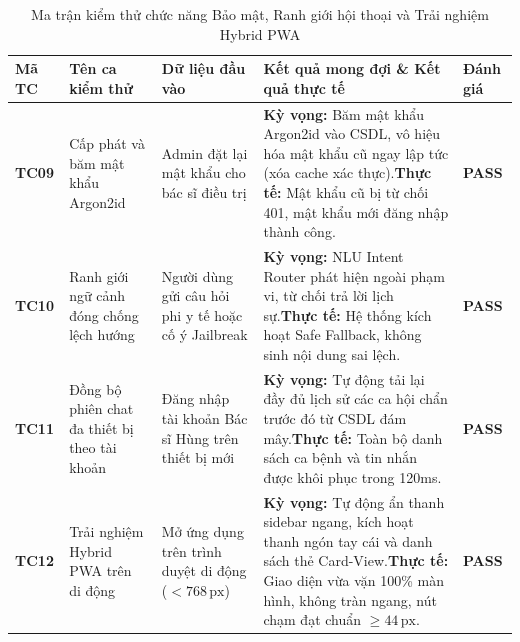 \begin{table}[htbp]
\centering
\small
\begin{tabularx}{\textwidth}{C{1.2cm} L{3.5cm} L{3.5cm} Y C{1.5cm}}
\toprule
\textbf{Mã TC} & \textbf{Tên ca kiểm thử} & \textbf{Dữ liệu đầu vào} & \textbf{Kết quả mong đợi \& Kết quả thực tế} & \textbf{Đánh giá} \\
\midrule
\textbf{TC09} & Cấp phát và băm mật khẩu Argon2id & Admin đặt lại mật khẩu cho bác sĩ điều trị & \textbf{Kỳ vọng:} Băm mật khẩu Argon2id vào CSDL, vô hiệu hóa mật khẩu cũ ngay lập tức (xóa cache xác thực).\newline \textbf{Thực tế:} Mật khẩu cũ bị từ chối 401, mật khẩu mới đăng nhập thành công. & \textbf{PASS} \\
\addlinespace
\textbf{TC10} & Ranh giới ngữ cảnh đóng chống lệch hướng & Người dùng gửi câu hỏi phi y tế hoặc cố ý Jailbreak & \textbf{Kỳ vọng:} NLU Intent Router phát hiện ngoài phạm vi, từ chối trả lời lịch sự.\newline \textbf{Thực tế:} Hệ thống kích hoạt Safe Fallback, không sinh nội dung sai lệch. & \textbf{PASS} \\
\addlinespace
\textbf{TC11} & Đồng bộ phiên chat đa thiết bị theo tài khoản & Đăng nhập tài khoản Bác sĩ Hùng trên thiết bị mới & \textbf{Kỳ vọng:} Tự động tải lại đầy đủ lịch sử các ca hội chẩn trước đó từ CSDL đám mây.\newline \textbf{Thực tế:} Toàn bộ danh sách ca bệnh và tin nhắn được khôi phục trong 120ms. & \textbf{PASS} \\
\addlinespace
\textbf{TC12} & Trải nghiệm Hybrid PWA trên di động & Mở ứng dụng trên trình duyệt di động ($< 768\,\text{px}$) & \textbf{Kỳ vọng:} Tự động ẩn thanh sidebar ngang, kích hoạt thanh ngón tay cái và danh sách thẻ Card-View.\newline \textbf{Thực tế:} Giao diện vừa vặn 100\% màn hình, không tràn ngang, nút chạm đạt chuẩn $\ge 44\,\text{px}$. & \textbf{PASS} \\
\bottomrule
\end{tabularx}
\caption{Ma trận kiểm thử chức năng Bảo mật, Ranh giới hội thoại và Trải nghiệm Hybrid PWA}
\end{table}
